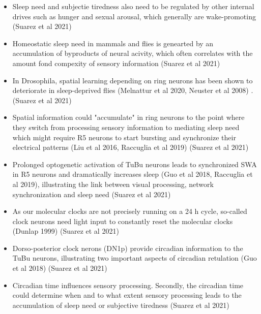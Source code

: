 \documentclass[11pt]{article}
\begin{document}
\begin{itemize}
    \item Sleep need and subjectie tiredness also need to be regulated by other internal drives such as hunger and sexual arousal,
    which generally are wake-promoting \parencite{suarez-grimaltNeuralArchitectureSleep2021}
    (Suarez et al 2021)

    \item Homeostatic sleep need in mammals and flies is genearted by an accumulation of byproducts of neural acivity, which often correlates
    with the amount fond compexity of sensory information \parencite{suarez-grimaltNeuralArchitectureSleep2021}
    (Suarez et al 2021)

    \item In Drosophila, spatial learning depending on ring neurons has been shown to deteriorate in sleep-deprived flies
    (Melnattur et al 2020, Neuster et al 2008) \parencite{suarez-grimaltNeuralArchitectureSleep2021}.
    (Suarez et al 2021)

    \item Spatial information could "accumulate" in ring neurons to the point where they switch from processing sensory information
    to mediating sleep need which might require R5 neurons to start bursting and synchronize their electrical patterns
    (Liu et al 2016, Raccuglia et al 2019) \parencite{suarez-grimaltNeuralArchitectureSleep2021}
    (Suarez et al 2021)

    \item Prolonged optogenetic activation of TuBu neurons leads to synchronized SWA in R5 neurons and dramatically increases
    sleep (Guo et al 2018, Raccuglia et al 2019), illustrating the link between visual processing, network synchronization
    and sleep need \parencite{suarez-grimaltNeuralArchitectureSleep2021}
    (Suarez et al 2021)

    \item As our molecular clocks are not precisely running on a 24 h cycle, so-called clock neurons need light input to constantly reset the molecular
    clocks (Dunlap 1999) \parencite{suarez-grimaltNeuralArchitectureSleep2021}
    (Suarez et al 2021)

    \item Dorso-posterior clock nerons (DN1p) provide circadian information to the TuBu neurons, illustrating two important
    aspects of circadian retulation (Guo et al 2018) \parencite{suarez-grimaltNeuralArchitectureSleep2021}
    (Suarez et al 2021)

    \item Circadian time influences sensory processing. Secondly, the circadian time could determine when and to
    what extent sensory processing leads to the accumulation of sleep need or subjective tiredness \parencite{suarez-grimaltNeuralArchitectureSleep2021}
    (Suarez et al 2021)


\end{itemize}
\end{document}
